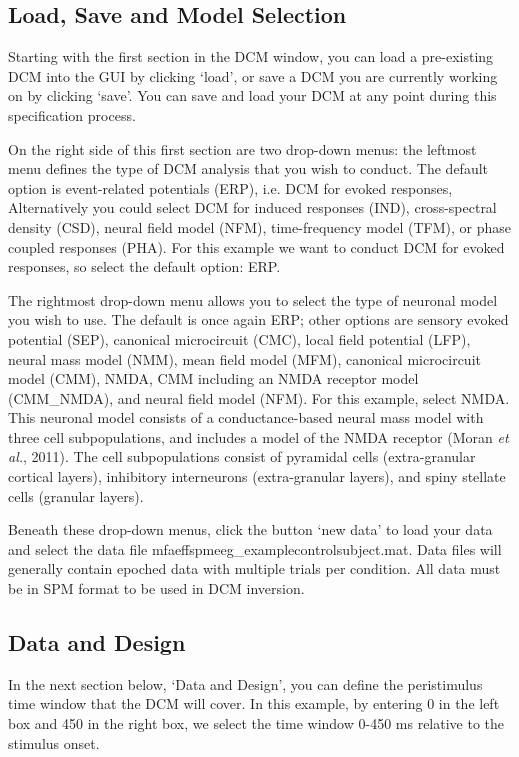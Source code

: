 \subsection{Load, Save and Model Selection}

Starting with the first section in the DCM window, you can load a
pre-existing DCM into the GUI by clicking `load', or save a DCM you are
currently working on by clicking `save'. You can save and load your DCM
at any point during this specification process.

On the right side of this first section are two drop-down menus: the
leftmost menu defines the type of DCM analysis that you wish to conduct.
The default option is event-related potentials (ERP), i.e. DCM for
evoked responses, Alternatively you could select DCM for induced
responses (IND), cross-spectral density (CSD), neural field model (NFM),
time-frequency model (TFM), or phase coupled responses (PHA). For this
example we want to conduct DCM for evoked responses, so select the
default option: ERP.

The rightmost drop-down menu allows you to select the type of neuronal
model you wish to use. The default is once again ERP; other options are
sensory evoked potential (SEP), canonical microcircuit (CMC), local
field potential (LFP), neural mass model (NMM), mean field model (MFM),
canonical microcircuit model (CMM), NMDA, CMM including an NMDA receptor
model (CMM\_NMDA), and neural field model (NFM). For this example,
select NMDA. This neuronal model consists of a conductance-based neural
mass model with three cell subpopulations, and includes a model of the
NMDA receptor (Moran \emph{et al.}, 2011). The cell subpopulations
consist of pyramidal cells (extra-granular cortical layers), inhibitory
interneurons (extra-granular layers), and spiny stellate cells (granular
layers).

Beneath these drop-down menus, click the button `new data' to load your
data and select the data file mfaeffspmeeg\_examplecontrolsubject.mat.
Data files will generally contain epoched data with multiple trials per
condition. All data must be in SPM format to be used in DCM inversion.

\subsection{Data and Design}

In the next section below, `Data and Design', you can define the
peristimulus time window that the DCM will cover. In this example, by
entering 0 in the left box and 450 in the right box, we select the time
window 0-450 ms relative to the stimulus onset.

